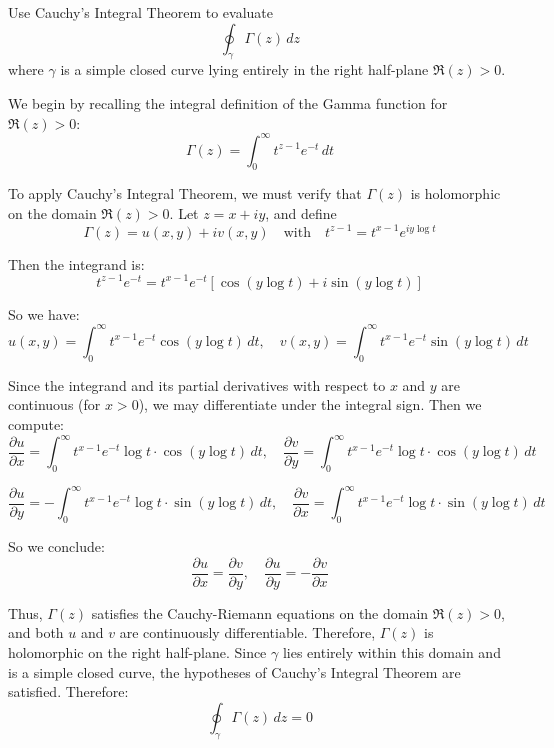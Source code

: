 \exampleline
\begin{example}
Use Cauchy's Integral Theorem to evaluate
\[
\oint_{\gamma} \Gamma(z) \, dz
\]
where \( \gamma \) is a simple closed curve lying entirely in the right half-plane \( \Re(z) > 0 \).

\begin{solution}
We begin by recalling the integral definition of the Gamma function for \( \Re(z) > 0 \):
\[
\Gamma(z) = \int_0^\infty t^{z-1} e^{-t} \, dt
\]

\noindent To apply Cauchy's Integral Theorem, we must verify that \( \Gamma(z) \) is holomorphic on the domain \( \Re(z) > 0 \). Let \( z = x + iy \), and define
\[
\Gamma(z) = u(x,y) + i v(x,y)
\quad \text{with} \quad
t^{z-1} = t^{x-1} e^{i y \log t}
\]

Then the integrand is:
\[
t^{z-1} e^{-t} = t^{x-1} e^{-t} \left[ \cos(y \log t) + i \sin(y \log t) \right]
\]

So we have:
\[
u(x,y) = \int_0^\infty t^{x-1} e^{-t} \cos(y \log t) \, dt, \quad
v(x,y) = \int_0^\infty t^{x-1} e^{-t} \sin(y \log t) \, dt
\]

\noindent Since the integrand and its partial derivatives with respect to \( x \) and \( y \) are continuous (for \( x > 0 \)), we may differentiate under the integral sign. Then we compute:
\[
\frac{\partial u}{\partial x} = \int_0^\infty t^{x-1} e^{-t} \log t \cdot \cos(y \log t) \, dt,
\quad
\frac{\partial v}{\partial y} = \int_0^\infty t^{x-1} e^{-t} \log t \cdot \cos(y \log t) \, dt
\]

\[
\frac{\partial u}{\partial y} = -\int_0^\infty t^{x-1} e^{-t} \log t \cdot \sin(y \log t) \, dt,
\quad
\frac{\partial v}{\partial x} = \int_0^\infty t^{x-1} e^{-t} \log t \cdot \sin(y \log t) \, dt
\]

\noindent So we conclude:
\[
\frac{\partial u}{\partial x} = \frac{\partial v}{\partial y}, \quad \frac{\partial u}{\partial y} = -\frac{\partial v}{\partial x}
\]

\noindent Thus, \( \Gamma(z) \) satisfies the Cauchy-Riemann equations on the domain \( \Re(z) > 0 \), and both \( u \) and \( v \) are continuously differentiable. Therefore, \( \Gamma(z) \) is holomorphic on the right half-plane. Since \( \gamma \) lies entirely within this domain and is a simple closed curve, the hypotheses of Cauchy's Integral Theorem are satisfied. Therefore:
\[
\oint_{\gamma} \Gamma(z) \, dz = 0
\]
\end{solution}
\end{example}
\exampleline


